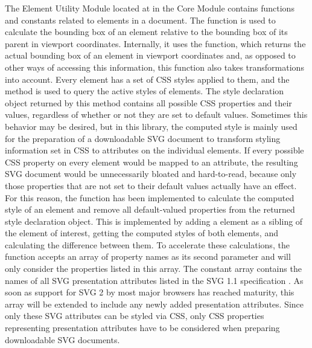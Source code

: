 The Element Utility Module located at  in
the Core Module contains functions and constants related to elements
in a document.  The  function is used to
calculate the bounding box of an element relative to the bounding box
of its parent in viewport coordinates.  Internally, it uses the
 function, which returns the actual
bounding box of an element in viewport coordinates and, as opposed to
other ways of accessing this information, this function also takes
transformations into account.  Every element has a set of CSS styles
applied to them, and the  method is used
to query the active styles of elements. The style declaration object
returned by this method contains all possible CSS properties and their
values, regardless of whether or not they are set to default values.
Sometimes this behavior may be desired, but in this library, the
computed style is mainly used for the preparation of a downloadable
SVG document to transform styling information set in CSS to attributes
on the individual elements. If every possible CSS property on every
element would be mapped to an attribute, the resulting SVG document
would be unnecessarily bloated and hard-to-read, because only those
properties that are not set to their default values actually have an
effect. For this reason, the
 function has been
implemented to calculate the computed style of an element and remove
all default-valued properties from the returned style declaration
object.  This is implemented by adding a  element
as a sibling of the element of interest, getting the computed styles
of both elements, and calculating the difference between them.  To
accelerate these calculations, the
 function accepts an array
of property names as its second parameter and will only consider the
properties listed in this array.  The constant
 array contains the names of all SVG
presentation attributes listed in the SVG 1.1 specification
\parencite{SVG11}.  As soon as support for SVG 2 \parencite{SVG2} by
most major browsers has reached maturity, this array will be extended
to include any newly added presentation attributes.  Since only these
SVG attributes can be styled via CSS, only CSS properties representing
presentation attributes have to be considered when preparing
downloadable SVG documents.

